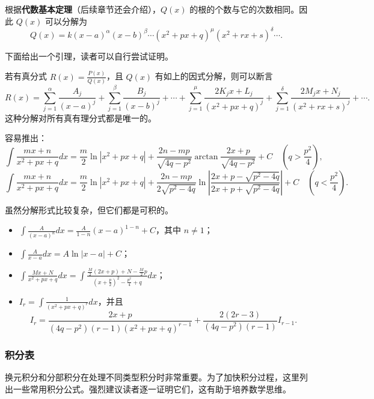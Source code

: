 根据\textbf{代数基本定理}（后续章节还会介绍），$Q(x)$ 的根的个数与它的次数相同。因此 $Q(x)$ 可以分解为
\[
Q(x)=k(x-a)^\alpha(x-b)^\beta\cdots(x^2+px+q)^\mu(x^2+rx+s)^\delta\cdots.
\]

下面给出一个引理，读者可以自行尝试证明。

\begin{lemma}
若有真分式 $R(x)=\frac{P(x)}{Q(x)}$，且 $Q(x)$ 有如上的因式分解，则可以断言
\[
R(x)=\sum_{j=1}^{\alpha}\frac{A_j}{(x-a)^j}+\sum_{j=1}^{\beta}\frac{B_j}{(x-b)^j}+\cdots+\sum_{j=1}^{\mu}\frac{2K_jx+L_j}{(x^2+px+q)^j}+\sum_{j=1}^{\delta}\frac{2M_jx+N_j}{(x^2+rx+s)^j}+\cdots.
\]
这种分解对所有真有理分式都是唯一的。
\end{lemma}

容易推出：
\[
\int \frac{mx+n}{x^2+px+q}dx=\frac{m}{2}\ln|x^2+px+q|+\frac{2n-mp}{\sqrt{4q-p^2}}\arctan\frac{2x+p}{\sqrt{4q-p^2}}+C\quad (q>\frac{p^2}{4}),
\]
\[
\int \frac{mx+n}{x^2+px+q}dx=\frac{m}{2}\ln|x^2+px+q|+\frac{2n-mp}{2\sqrt{p^2-4q}}\ln\left|\frac{2x+p-\sqrt{p^2-4q}}{2x+p+\sqrt{p^2-4q}}\right|+C\quad (q<\frac{p^2}{4}).
\]

虽然分解形式比较复杂，但它们都是可积的。
\begin{itemize}
    \item $\int \frac{A}{(x-a)^n}dx=\frac{A}{1-n}(x-a)^{1-n}+C$，其中 $n\ne 1$；
    \item $\int \frac{A}{x-a}dx=A\ln|x-a|+C$；
    \item $\int \frac{Mx+N}{x^2+px+q}dx=\int \frac{\frac{M}{2}(2x+p)+N-\frac{M}{2}p}{(x+\frac{p}{2})^2-\frac{p^2}{4}+q}dx$；
    \item $I_r=\int \frac{1}{(x^2+px+q)^r}dx$，并且
    \[
    I_r=\frac{2x+p}{(4q-p^2)(r-1)(x^2+px+q)^{r-1}}+\frac{2(2r-3)}{(4q-p^2)(r-1)}I_{r-1}.
    \]
\end{itemize}

\subsubsection{积分表}

换元积分和分部积分在处理不同类型积分时非常重要。为了加快积分过程，这里列出一些常用积分公式。强烈建议读者逐一证明它们，这有助于培养数学思维。

